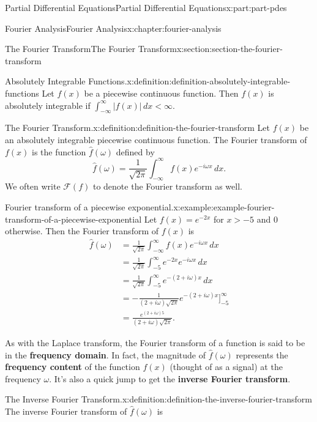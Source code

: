 \documentclass[oneside,10pt,]{book}
\newcommand{\terminology}[1]{\textbf{#1}}
\numberwithin{equation}{part}
\newcommand{\lt}{<}
\newcommand{\amp}{&}
\begin{document}
\begin{partptx}{Partial Differential Equations}{}{Partial Differential Equations}{}{}{x:part:part-pdes}
\begin{chapterptx}{Fourier Analysis}{}{Fourier Analysis}{}{}{x:chapter:fourier-analysis}
\begin{sectionptx}{The Fourier Transform}{}{The Fourier Transform}{}{}{x:section:section-the-fourier-transform}
\begin{definition}{Absolutely Integrable Functions.}{x:definition:definition-absolutely-integrable-functions}%
%
Let \(f(x)\) be a piecewise continuous function. Then \(f(x)\) is absolutely integrable if \(\int_{-\infty}^{\infty}|f(x)|\,dx \lt \infty.\)%
\end{definition}
\begin{definition}{The Fourier Transform.}{x:definition:definition-the-fourier-transform}%
%
Let \(f(x)\) be an absolutely integrable piecewise continuous function. The Fourier transform of \(f(x)\) is the function \(\hat{f}(\omega)\) defined by%
\begin{equation*}
\hat{f}(\omega) = \frac{1}{\sqrt{2\pi}}\int_{-\infty}^{\infty}f(x)e^{-i\omega x}\,dx.
\end{equation*}
We often write \(\mathcal{F}(f)\) to denote the Fourier transform as well.%
\end{definition}
\begin{example}{Fourier transform of a piecewise exponential.}{x:example:example-fourier-transform-of-a-piecewise-exponential}%
Let \(f(x) = e^{-2x}\) for \(x>-5\) and \(0\) otherwise. Then the Fourier transform of \(f(x)\) is%
\begin{align*}
\hat{f}(\omega) \amp = \frac{1}{\sqrt{2\pi}}\int_{-\infty}^{\infty}f(x)e^{-i\omega x}\,dx \\
\amp = \frac{1}{\sqrt{2\pi}}\int_{-5}^{\infty}e^{-2x}e^{-i\omega x}\,dx \\
\amp = \frac{1}{\sqrt{2\pi}}\int_{-5}^{\infty}e^{-(2+i\omega)x}\,dx \\
\amp = -\frac{1}{(2+i\omega)\sqrt{2\pi}}e^{-(2+i\omega)x}\Big]_{-5}^{\infty}\\
\amp = \frac{e^{(2+i\omega)5}}{(2+i\omega)\sqrt{2\pi}}. 
\end{align*}
%
\end{example}
As with the Laplace transform, the Fourier transform of a function is said to be in the \terminology{frequency domain}. In fact, the magnitude of \(\hat{f}(\omega)\) represents the \terminology{frequency content} of the function \(f(x)\) (thought of as a signal) at the frequency \(\omega\). It's also a quick jump to get the \terminology{inverse Fourier transform}.%
\begin{definition}{The Inverse Fourier Transform.}{x:definition:definition-the-inverse-fourier-transform}%
%
The inverse Fourier transform of \(\hat{f}(\omega)\) is%

\end{definition}
\end{sectionptx}
\end{chapterptx}
\end{partptx}
\end{document}
